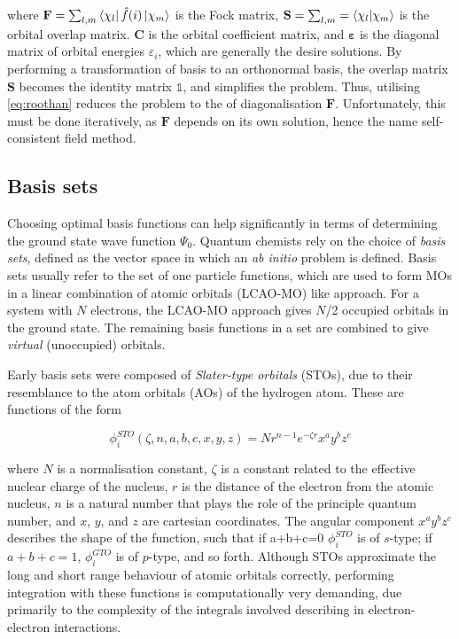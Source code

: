 \noindent where $\mathbf{F} = \sum_{l,m} \bra{\chi_l} \hat{f}(i) \ket{\chi_m}$ is the Fock matrix, $\mathbf{S} = \sum_{l,m} = \bra{\chi_l}\ket{\chi_m}$ is the orbital overlap matrix. $\mathbf{C}$ is the orbital coefficient matrix, and $\mathbf{\varepsilon}$ is the diagonal matrix of orbital energies $\varepsilon_i$, which are generally the desire solutions. By performing a transformation of basis to an orthonormal basis, the overlap matrix $\mathbf{S}$ becomes the identity matrix $\mathbb{1}$, and simplifies the problem. Thus, utilising \ref{eq:roothan} reduces the problem to the of diagonalisation $\mathbf{F}$. Unfortunately, this must be done iteratively, as $\mathbf{F}$ depends on its own solution, hence the name self-consistent field method.

\subsection{Basis sets}

Choosing optimal basis functions can help significantly in terms of determining the ground state wave function $\Psi_0$. Quantum chemists rely on the choice of \emph{basis sets}, defined as the vector space in which an \emph{ab initio} problem is defined. Basis sets usually refer to the set of one particle functions, which are used to form MOs in a linear combination of atomic orbitals (LCAO-MO) like approach. For a system with $N$ electrons, the LCAO-MO approach gives $N$/2 occupied orbitals in the ground state. The remaining basis functions in a set are combined to give \emph{virtual} (unoccupied) orbitals.

Early basis sets were composed of \emph{Slater-type orbitals} (STOs), due to their resemblance to the atom orbitals (AOs) of the hydrogen atom. These are functions of the form

\begin{equation}
\phi_i^{STO}(\zeta,n,a,b,c,x,y,z) = Nr^{n-1}e^{-\zeta r}x^ay^bz^c
\end{equation}

\noindent where $N$ is a normalisation constant, $\zeta$ is a constant related to the effective nuclear charge of the nucleus, $r$ is the distance of the electron from the atomic nucleus, $n$ is a natural number that plays the role of the principle quantum number, and $x$, $y$, and $z$ are cartesian coordinates. The angular component $x^ay^bz^c$ describes the shape of the function, such that if a+b+c=0 $\phi_i^{STO}$ is of $s$-type; if $a+b+c=1$, $\phi_i^{GTO}$ is of $p$-type, and so forth. Although STOs approximate the long and short range behaviour of atomic orbitals correctly, performing integration with these functions is computationally very demanding, due primarily to the complexity of the integrals involved describing in electron-electron interactions.

